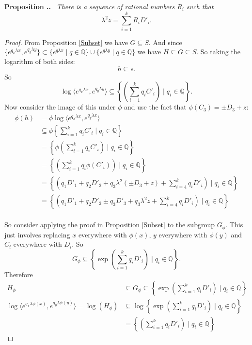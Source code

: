 \documentclass[honours]{UNSWthesis}
\newcommand{\Q}{\mathbb{Q}}
\newcommand{\1}{\mathbf{e}_{1}}
\newcommand{\2}{\mathbf{e}_{3}}
\newcommand{\3}{\mathbf{e}_{3}}
\newcounter{Item}[section]
\newenvironment{Proposition}{\medskip
                            \refstepcounter{Item}
                            \noindent
                           {\bf Proposition \thesection.\theItem.}\ %
                            \begingroup \sl}
                           {\endgroup\medskip}
\begin{document}
\begin{Proposition}\label{Rational}
There is a sequence of rational numbers $R_{i}$ such that
\[
\lambda^{2}z= \sum\limits_{i=1}^{k}R_{i}D'_{i}.
\]
\end{Proposition}

\begin{proof}
From Proposition \ref{Subset} we have $G \subseteq S$. And since $\{ e^{q_{x}\lambda x}, e^{q_{y}\lambda y} \}\subset \{ e^{q\lambda x} \mid q \in \Q \}\cup \{ e^{q\lambda y} \mid q \in \Q \}$ we have $H \subseteq G \subseteq S$. So taking the logarithm of both sides:
\[
h \subseteq s.
\]
So 
\[
\log \langle e^{q_{x}\lambda x},e^{q_{y}\lambda y} \rangle \subseteq \left\lbrace \left(\sum\limits_{i=1}^{k}q_{i}C'_{i}\right) \mid q_{i} \in \Q \right\rbrace.
\]
Now consider the image of this under $\phi$ and use the fact that $\phi(C_{3})= \pm D_{3} + z$:
\begin{align*}
\phi(h) &=
\phi \log \langle e^{q_{x}\lambda x},e^{q_{y}\lambda x} \rangle \\
&\subseteq \phi \left\lbrace \sum\limits_{i=1}^{k}q_{i}C'_{i} \mid q_{i} \in \Q \right\rbrace \\
&= \left\lbrace \phi \left(\sum\limits_{i=1}^{k}q_{i}C'_{i}\right) \mid q_{i} \in \Q \right\rbrace \\
&= \left\lbrace \left(\sum\limits_{i=1}^{k}q_{i}\phi(C'_{i})\right) \mid q_{i} \in \Q \right\rbrace \\
&= \left\lbrace \left(q_{1}D'_{1}+q_{2}D'_{2} + q_{3}\lambda^{2}(\pm D_{3} + z) +\sum\limits_{i=4}^{k}q_{i}D'_{i}\right) \mid q_{i} \in \Q \right\rbrace \\
&= \left\lbrace \left(q_{1}D'_{1}+q_{2}D'_{2} \pm q_{3}D'_{3} + q_{3}\lambda^{2}z +\sum\limits_{i=4}^{k}q_{i}D'_{i}\right) \mid q_{i} \in \Q \right\rbrace \\
\end{align*}



So consider applying the proof in Proposition \ref{Subset} to the subgroup $G_{\phi}$. This just involves replacing $x$ everywhere with $\phi(x)$, $y$ everywhere with $\phi(y)$ and $C_{i}$ everywhere with $D_{i}$. So 
\[
G_{\phi} \subseteq \left\lbrace \exp \left(\sum\limits_{i=1}^{k}q_{i}D'_{i}\right) \mid q_{i} \in \Q \right\rbrace.
\]
Therefore
\begin{align*}
H_{\phi} &\subseteq G_{\phi}  \subseteq \left\lbrace \exp \left(\sum\limits_{i=1}^{k}q_{i}D'_{i}\right) \mid q_{i} \in \Q \right\rbrace \\
\log \langle e^{q_{x}\lambda \phi(x)},e^{q_{y}\lambda \phi(y)} \rangle =\log (H_{\phi})&\subseteq \log \left\lbrace \exp \left(\sum\limits_{i=1}^{k}q_{i}D'_{i}\right) \mid q_{i} \in \Q \right\rbrace \\
&= \left\lbrace \left(\sum\limits_{i=1}^{k}q_{i}D'_{i}\right) \mid q_{i} \in \Q \right\rbrace 
\end{align*}


\end{proof}
\end{document}
